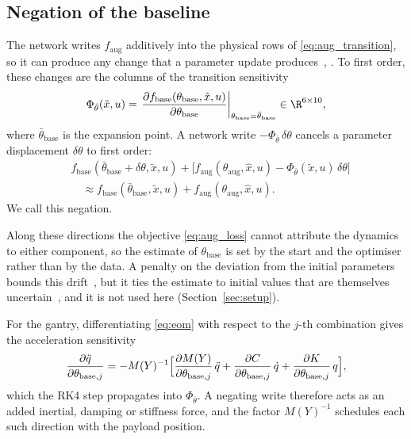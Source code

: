 \subsection{Negation of the baseline}\label{sec:obc_negation}
The network writes $f_{\mathrm{aug}}$ additively into the physical rows of
\eqref{eq:aug_transition}, so it can produce any change that a parameter update
produces~\cite[Ex.~1]{gyorok2025l4dc}, \cite[Ex.~2]{gyorok2026obc}.
To first order, these changes are the columns of the transition sensitivity
\begin{equation}
 \Phi_{\bar\theta}(\tilde x,u)
 =\left.\frac{\partial f_{\mathrm{base}}(\theta_{\mathrm{base}},\tilde x,u)}
   {\partial\theta_{\mathrm{base}}}\right|_{\theta_{\mathrm{base}}=\bar\theta_{\mathrm{base}}}
   \in\R^{6\times10},
\label{eq:obc_sens}
\end{equation}
where $\bar\theta_{\mathrm{base}}$ is the expansion point.
A network write $-\Phi_{\bar\theta}\,\delta\theta$ cancels a parameter
displacement $\delta\theta$ to first order:
\begin{equation}
\begin{aligned}
 &f_{\mathrm{base}}(\bar\theta_{\mathrm{base}}+\delta\theta,\tilde x,u)
 +\bigl[f_{\mathrm{aug}}(\theta_{\mathrm{aug}},\hat x,u)
 -\Phi_{\bar\theta}(\tilde x,u)\,\delta\theta\bigr]\\
 &\quad\approx f_{\mathrm{base}}(\bar\theta_{\mathrm{base}},\tilde x,u)
 +f_{\mathrm{aug}}(\theta_{\mathrm{aug}},\hat x,u).
\end{aligned}
\label{eq:obc_negation}
\end{equation}
We call this negation.

Along these directions the objective \eqref{eq:aug_loss} cannot attribute the
dynamics to either component, so the estimate of $\theta_{\mathrm{base}}$ is
set by the start and the optimiser rather than by the data.
A penalty on the deviation from the initial parameters bounds this
drift~\cite[Sec.~3.4]{hoekstra2025lfr}, but it ties the estimate to initial
values that are themselves uncertain~\cite[Sec.~5.2]{gyorok2026obc}, and it is
not used here (Section~\ref{sec:setup}).

For the gantry, differentiating \eqref{eq:eom} with respect to the $j$-th
combination gives the acceleration sensitivity
\begin{equation}
 \frac{\partial\ddot q}{\partial\theta_{\mathrm{base},j}}
 =-M(Y)^{-1}\Bigl[\frac{\partial M(Y)}{\partial\theta_{\mathrm{base},j}}\,\ddot q
 +\frac{\partial C}{\partial\theta_{\mathrm{base},j}}\,\dot q
 +\frac{\partial K}{\partial\theta_{\mathrm{base},j}}\,q\Bigr],
\label{eq:obc_gantry_sens}
\end{equation}
which the RK4 step propagates into $\Phi_{\bar\theta}$.
A negating write therefore acts as an added inertial, damping or stiffness
force, and the factor $M(Y)^{-1}$ schedules each such direction with the
payload position.

